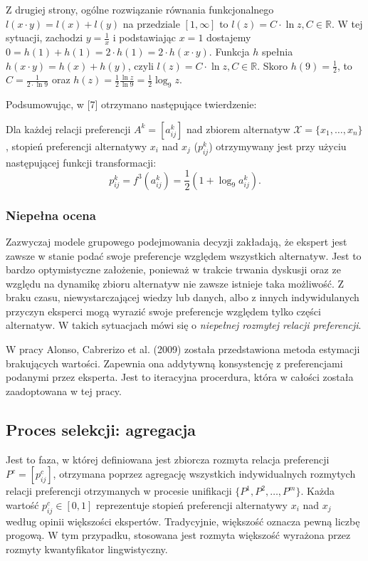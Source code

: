 Z drugiej strony, ogólne rozwiązanie równania funkcjonalnego $l(x \cdot y) =
l(x) + l(y)$ na przedziale $[1, \infty]$ to $l(z) = C \cdot \ln z, C \in
\mathbb{R}.$
W tej sytuacji, zachodzi $y = \frac{1}{x}$ i podstawiając $x = 1$ dostajemy $0
= h(1) + h(1) = 2 \cdot h(1) = 2 \cdot h(x \cdot y).$ Funkcja $h$ spełnia
$h(x \cdot y) = h(x) + h(y)$, czyli $l(z) = C \cdot \ln z, C \in \mathbb{R}.$
Skoro $h(9) = \frac{1}{2}$, to $C = \frac{1}{2 \cdot \ln 9}$ oraz $h(z) =
\frac{1}{2} \frac{\ln z}{\ln 9} = \frac{1}{2} \log_9 z.$

Podsumowując, w [7] otrzymano następujące twierdzenie:
\begin{theorem}
Dla każdej relacji preferencji $A^k = [a^k_{ij}]$ nad zbiorem alternatyw
$\mathcal{X} = \{x_1,\dotsc,x_n\}$, stopień preferencji alternatywy $x_i$ nad
$x_j$ ($p^k_{ij}$) otrzymywany jest przy użyciu następującej funkcji
transformacji:
\begin{equation}
p^k_{ij} = f^3(a^k_{ij}) = \frac{1}{2}(1 + \log_9 a^k_{ij}).
\end{equation}
\end{theorem}

\subsubsection{Niepełna ocena}
Zazwyczaj modele grupowego podejmowania decyzji zakładają, że ekspert jest
zawsze w stanie podać swoje preferencje względem wszystkich alternatyw. Jest to
bardzo optymistyczne założenie, ponieważ w trakcie trwania dyskusji oraz ze
względu na dynamikę zbioru alternatyw nie zawsze istnieje taka możliwość. Z
braku czasu, niewystarczającej wiedzy lub danych, albo z innych indywidulanych
przyczyn eksperci mogą wyrazić swoje preferencje względem tylko części
alternatyw. W takich sytuacjach mówi się o \emph{niepełnej rozmytej relacji
preferencji}.

W pracy Alonso, Cabrerizo et al. (2009) została przedstawiona metoda estymacji
brakujących wartości. Zapewnia ona addytywną konsystencję z preferencjami
podanymi przez eksperta. Jest to iteracyjna procerdura, która w całości została
zaadoptowana w tej pracy.

\subsection{Proces selekcji: agregacja}
Jest to faza, w której definiowana jest zbiorcza rozmyta relacja preferencji
$P^c = [p^c_{ij}]$, otrzymana poprzez agregację wszystkich indywidualnych
rozmytych relacji preferencji otrzymanych w procesie unifikacji $\{ P^1, P^2,
\dotsc, P^m \}$. Każda wartość $p^c_{ij} \in [0,1]$ reprezentuje stopień
preferencji alternatywy $x_i$ nad $x_j$ według opinii większości ekspertów.
Tradycyjnie, większość oznacza pewną liczbę progową. W tym przypadku, stosowana
jest rozmyta większość wyrażona przez rozmyty kwantyfikator lingwistyczny.


